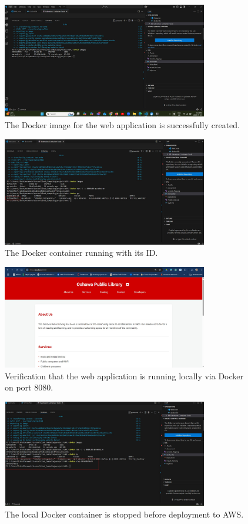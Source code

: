 \documentclass[a4paper,12pt]{article}
\begin{document}
\begin{figure}[h]
    \centering
    \includegraphics[width=0.8\textwidth]{docker_image_created.jpg}
    \caption{The Docker image for the web application is successfully created.}
\end{figure}
\begin{figure}[h]
    \centering
    \includegraphics[width=0.8\textwidth]{docker_containerID.jpg}
    \caption{The Docker container running with its ID.}
\end{figure}
\begin{figure}[h]
    \centering
    \includegraphics[width=0.8\textwidth]{webapp_running_via_docker.jpg}
    \caption{Verification that the web application is running locally via Docker on port 8080.}
\end{figure}
\begin{figure}[h]
    \centering
    \includegraphics[width=0.8\textwidth]{local_docker_stopped.jpg}
    \caption{The local Docker container is stopped before deployment to AWS.}
\end{figure}
\end{document}
